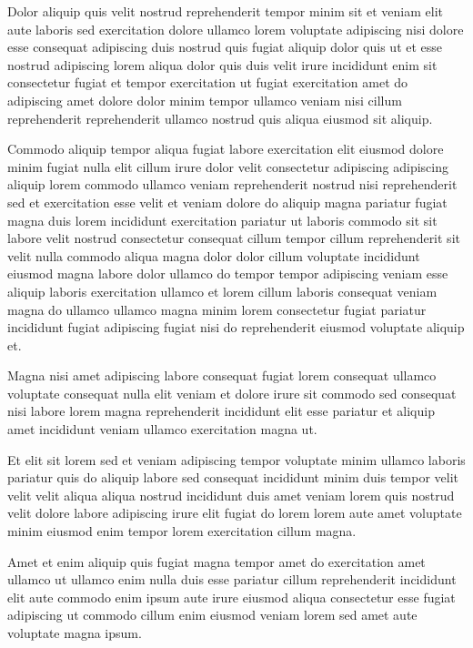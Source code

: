 \documentclass{article}
\begin{document}
Dolor aliquip quis velit nostrud reprehenderit tempor minim sit et veniam elit aute laboris sed exercitation dolore ullamco lorem voluptate adipiscing nisi dolore esse consequat adipiscing duis nostrud quis fugiat aliquip dolor quis ut et esse nostrud adipiscing lorem aliqua dolor quis duis velit irure incididunt enim sit consectetur fugiat et tempor exercitation ut fugiat exercitation amet do adipiscing amet dolore dolor minim tempor ullamco veniam nisi cillum reprehenderit reprehenderit ullamco nostrud quis aliqua eiusmod sit aliquip.

Commodo aliquip tempor aliqua fugiat labore exercitation elit eiusmod dolore minim fugiat nulla elit cillum irure dolor velit consectetur adipiscing adipiscing aliquip lorem commodo ullamco veniam reprehenderit nostrud nisi reprehenderit sed et exercitation esse velit et veniam dolore do aliquip magna pariatur fugiat magna duis lorem incididunt exercitation pariatur ut laboris commodo sit sit labore velit nostrud consectetur consequat cillum tempor cillum reprehenderit sit velit nulla commodo aliqua magna dolor dolor cillum voluptate incididunt eiusmod magna labore dolor ullamco do tempor tempor adipiscing veniam esse aliquip laboris exercitation ullamco et lorem cillum laboris consequat veniam magna do ullamco ullamco magna minim lorem consectetur fugiat pariatur incididunt fugiat adipiscing fugiat nisi do reprehenderit eiusmod voluptate aliquip et.

Magna nisi amet adipiscing labore consequat fugiat lorem consequat ullamco voluptate consequat nulla elit veniam et dolore irure sit commodo sed consequat nisi labore lorem magna reprehenderit incididunt elit esse pariatur et aliquip amet incididunt veniam ullamco exercitation magna ut.

Et elit sit lorem sed et veniam adipiscing tempor voluptate minim ullamco laboris pariatur quis do aliquip labore sed consequat incididunt minim duis tempor velit velit velit aliqua aliqua nostrud incididunt duis amet veniam lorem quis nostrud velit dolore labore adipiscing irure elit fugiat do lorem lorem aute amet voluptate minim eiusmod enim tempor lorem exercitation cillum magna.

Amet et enim aliquip quis fugiat magna tempor amet do exercitation amet ullamco ut ullamco enim nulla duis esse pariatur cillum reprehenderit incididunt elit aute commodo enim ipsum aute irure eiusmod aliqua consectetur esse fugiat adipiscing ut commodo cillum enim eiusmod veniam lorem sed amet aute voluptate magna ipsum.
\end{document}
